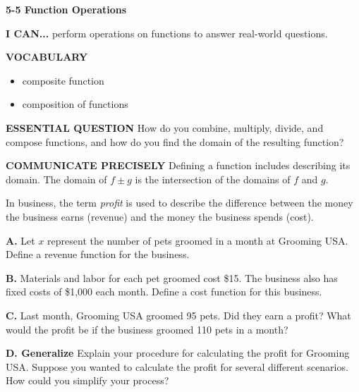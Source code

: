 \documentclass{article}
\newenvironment{lesson-meta}{}{}
\newenvironment{model-discuss}{}{}
\newcommand{\placeholder}[2]{}
\begin{document}
\begin{lesson-meta}
\textbf{5-5 Function Operations}

\textbf{I CAN...} perform operations on functions to answer real-world questions.

\textbf{VOCABULARY}
\begin{itemize}
    \item composite function
    \item composition of functions
\end{itemize}

\textbf{ESSENTIAL QUESTION} How do you combine, multiply, divide, and compose functions, and how do you find the domain of the resulting function?
\end{lesson-meta}

\textbf{COMMUNICATE PRECISELY}
Defining a function includes describing its domain. The domain of $f \pm g$ is the intersection of the domains of $f$ and $g$.

\begin{model-discuss}
In business, the term \textit{profit} is used to describe the difference between the money the business earns (revenue) and the money the business spends (cost).

\placeholder{photo}{Illustration of a man grooming a bulldog, with a sign reading "GROOMING \$25 per pet".}

\textbf{A.} Let $x$ represent the number of pets groomed in a month at Grooming USA. Define a revenue function for the business.

\textbf{B.} Materials and labor for each pet groomed cost \$15. The business also has fixed costs of \$1,000 each month. Define a cost function for this business.

\textbf{C.} Last month, Grooming USA groomed 95 pets. Did they earn a profit? What would the profit be if the business groomed 110 pets in a month?

\textbf{D. Generalize} Explain your procedure for calculating the profit for Grooming USA. Suppose you wanted to calculate the profit for several different scenarios. How could you simplify your process?
\end{model-discuss}
\end{document}
